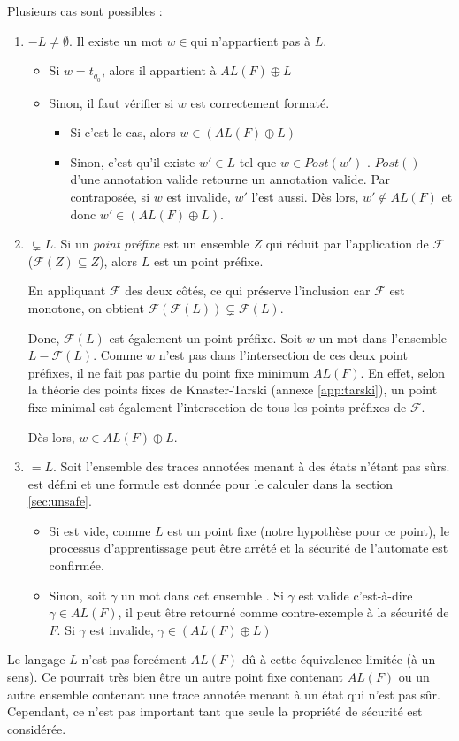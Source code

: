 Plusieurs cas sont possibles :
\begin{enumerate}
  \item \fl$-L\neq\emptyset$. Il existe un mot $w\in$\fl qui n'appartient pas à $L$.
  \begin{itemize}
    \item Si $w=t_{q_0}$, alors il appartient à $AL(F)\oplus L$
    \item Sinon, il faut vérifier si $w$ est correctement formaté.
      \begin{itemize}
          \item Si c'est le cas, alors $w\in(AL(F)\oplus L)$
          \item Sinon, c'est qu'il existe $w'\in L$ tel que $w\in Post(w')$ . $Post()$ d'une annotation valide retourne un annotation valide. Par contraposée, si $w$ est invalide, $w'$ l'est aussi. Dès lors, $w'\notin AL(F)$ et donc $w'\in(AL(F)\oplus L)$.
      \end{itemize}
  \end{itemize}
  \item \fl$\subsetneq L$. Si un \emph{point préfixe} est un ensemble $Z$ qui réduit par l'application de $\mathcal{F}$ ($\mathcal{F}(Z)\subseteq Z$), alors $L$ est un point préfixe.

   En appliquant $\mathcal{F}$ des deux côtés, ce qui préserve l'inclusion car $\mathcal{F}$ est monotone, on obtient $\mathcal{F}(\mathcal{F}(L))\subsetneq\mathcal{F}(L)$.

   Donc, $\mathcal{F}(L)$ est également un point préfixe. Soit $w$ un mot dans l'ensemble $L-\mathcal{F}(L)$. Comme $w$ n'est pas dans l'intersection de ces deux point préfixes, il ne fait pas partie du point fixe minimum $AL(F)$. En effet, selon la théorie des points fixes de Knaster-Tarski (annexe \ref{app:tarski}), un point fixe minimal est également l'intersection de tous les points préfixes de $\mathcal{F}$.

   Dès lors, $w\in AL(F)\oplus L$.
  \item \fl$=L$. Soit \wl l'ensemble des traces annotées menant à des états n'étant pas sûrs. \wl est défini et une formule est donnée pour le calculer dans la section \ref{sec:unsafe}.
  \begin{itemize}
    \item Si \wl est vide, comme $L$ est un point fixe (notre hypothèse pour ce point), le processus d'apprentissage peut être arrêté et la sécurité de l'automate est confirmée.
    \item Sinon, soit $\gamma$ un mot dans cet ensemble \wl. Si $\gamma$ est valide c'est-à-dire $\gamma\in AL(F)$, il peut être retourné comme contre-exemple à la sécurité de $F$. Si $\gamma$ est invalide, $\gamma\in(AL(F)\oplus L)$
  \end{itemize}
\end{enumerate}

Le langage $L$ n'est pas forcément $AL(F)$ dû à cette équivalence limitée (à un sens). Ce pourrait très bien être un autre point fixe contenant $AL(F)$ ou un autre ensemble contenant une trace annotée menant à un état qui n'est pas sûr. Cependant, ce n'est pas important tant que seule la propriété de sécurité est considérée.
